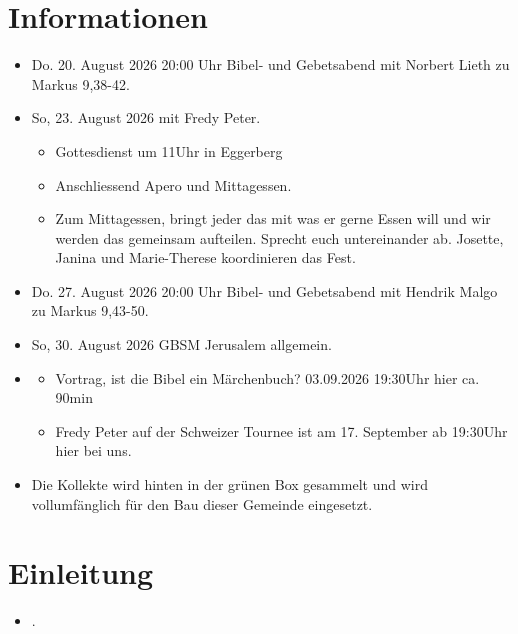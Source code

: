 \documentclass[fontsize=14pt]{mybib}
\begin{document}
\section{Informationen}
\begin{itemize}
    \item {} Do. 20. August 2026 20:00 Uhr Bibel- und Gebetsabend mit Norbert Lieth zu Markus 9,38-42.\\
    \item {} So, 23. August 2026 mit Fredy Peter.
    \begin{itemize}
        \item Gottesdienst um 11Uhr in Eggerberg
        \item Anschliessend Apero und Mittagessen.
        \item Zum Mittagessen, bringt jeder das mit was er gerne Essen will und wir werden das gemeinsam aufteilen. Sprecht euch untereinander ab. Josette, Janina und Marie-Therese koordinieren das Fest.
    \end{itemize}
    \item {} Do. 27. August 2026 20:00 Uhr Bibel- und Gebetsabend mit Hendrik Malgo zu Markus 9,43-50.\\
    \item {} So, 30. August 2026 GBSM Jerusalem allgemein.
    \item {} 
    \begin{itemize}
        \item Vortrag, ist die Bibel ein Märchenbuch? 03.09.2026 19:30Uhr hier ca. 90min
        \item Fredy Peter auf der Schweizer Tournee ist am 17. September ab 19:30Uhr hier bei uns.
    \end{itemize}        
    \item {} Die Kollekte wird hinten in der grünen Box gesammelt und wird vollumfänglich für den Bau dieser Gemeinde eingesetzt.
\end{itemize}
\section{Einleitung}

  

\begin{itemize}
    \item {}.
\end{itemize}
\end{document}
